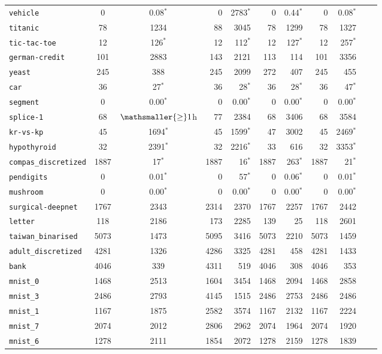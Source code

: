 \begin{tabular}{lccrrrrrrrr}
\texttt{vehicle} & 0 & 0.08$^*$ & 0 & 2783$^*$ & 0 & 0.44$^*$ & 0 & 0.08$^*$\\
\texttt{titanic} & 78 & 1234 & 88 & 3045 & 78 & 1299 & 78 & 1327\\
\texttt{tic-tac-toe} & 12 & 126$^*$ & 12 & 112$^*$ & 12 & 127$^*$ & 12 & 257$^*$\\
\texttt{german-credit} & 101 & 2883 & 143 & 2121 & 113 & 114 & 101 & 3356\\
\texttt{yeast} & 245 & 388 & 245 & 2099 & 272 & 407 & 245 & 455\\
\texttt{car} & 36 & 27$^*$ & 36 & 28$^*$ & 36 & 28$^*$ & 36 & 47$^*$\\
\texttt{segment} & 0 & 0.00$^*$ & 0 & 0.00$^*$ & 0 & 0.00$^*$ & 0 & 0.00$^*$\\
\texttt{splice-1} & 68 & $\mathsmaller{\geq}1$h & 77 & 2384 & 68 & 3406 & 68 & 3584\\
\texttt{kr-vs-kp} & 45 & 1694$^*$ & 45 & 1599$^*$ & 47 & 3002 & 45 & 2469$^*$\\
\texttt{hypothyroid} & 32 & 2391$^*$ & 32 & 2216$^*$ & 33 & 616 & 32 & 3353$^*$\\
\texttt{compas\_discretized} & 1887 & 17$^*$ & 1887 & 16$^*$ & 1887 & 263$^*$ & 1887 & 21$^*$\\
\texttt{pendigits} & 0 & 0.01$^*$ & 0 & 57$^*$ & 0 & 0.06$^*$ & 0 & 0.01$^*$\\
\texttt{mushroom} & 0 & 0.00$^*$ & 0 & 0.00$^*$ & 0 & 0.00$^*$ & 0 & 0.00$^*$\\
\texttt{surgical-deepnet} & 1767 & 2343 & 2314 & 2370 & 1767 & 2257 & 1767 & 2442\\
\texttt{letter} & 118 & 2186 & 173 & 2285 & 139 & 25 & 118 & 2601\\
\texttt{taiwan\_binarised} & 5073 & 1473 & 5095 & 3416 & 5073 & 2210 & 5073 & 1459\\
\texttt{adult\_discretized} & 4281 & 1326 & 4286 & 3325 & 4281 & 458 & 4281 & 1433\\
\texttt{bank} & 4046 & 339 & 4311 & 519 & 4046 & 308 & 4046 & 353\\
\texttt{mnist\_0} & 1468 & 2513 & 1604 & 3454 & 1468 & 2094 & 1468 & 2858\\
\texttt{mnist\_3} & 2486 & 2793 & 4145 & 1515 & 2486 & 2753 & 2486 & 2486\\
\texttt{mnist\_1} & 1167 & 1875 & 2582 & 3574 & 1167 & 2132 & 1167 & 2224\\
\texttt{mnist\_7} & 2074 & 2012 & 2806 & 2962 & 2074 & 1964 & 2074 & 1920\\
\texttt{mnist\_6} & 1278 & 2111 & 1854 & 2072 & 1278 & 2159 & 1278 & 1839\\

\end{tabular}
